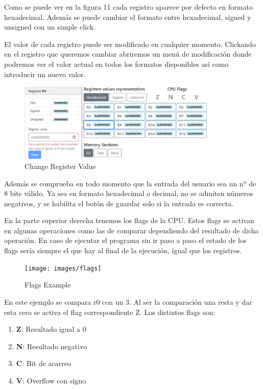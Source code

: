 {{            Como se puede ver en la figura 11 cada registro aparece por defecto en formato hexadecimal.
            Además se puede cambiar el formato entre hexadecimal, signed y unsigned con un simple click.

            El valor de cada registro puede ser modificado en cualquier momento. Clickando en el registro
            que queremos cambiar abriremos un menú de modificación donde podremos ver el valor actual en
            todos los formatos disponibles así como introducir un nuevo valor.

            \begin{figure}[h]
                \centering
                \includegraphics[width=0.85\textwidth]{images/modifyregister}
                \caption{Change Register Value}
            \end{figure}

            Además se comprueba en todo momento que la entrada del usuario sea un nº de 8 bits válido.
            Ya sea en formato hexadecimal o decimal, no se admiten números negativos, y se habilita el botón
            de guardar solo si la entrada es correcta.

            En la parte superior derecha tenemos los flags de la CPU. Estos flags se activan en algunas operaciones
            como las de comparar dependiendo del resultado de dicha operación. En caso de ejecutar el programa sin ir
            paso a paso el estado de los flags sería siempre el que hay al final de la ejecución, 
            igual que los registros.

            \begin{figure}[h]
                \centering
                \texttt{[image: images/flags]}
                \caption{Flags Example}
            \end{figure}

            En este ejemplo se compara r0 con un 3. Al ser la comparación una resta y dar esta cero se activa
            el flag correspondiente Z. Los distintos flags son:
            \begin{enumerate}
                \item \textbf{Z}: Resultado igual a 0
                \item \textbf{N}: Resultado negativo
                \item \textbf{C}: Bit de acarreo
                \item \textbf{V}: Overflow con signo
            \end{enumerate}
        }

}
